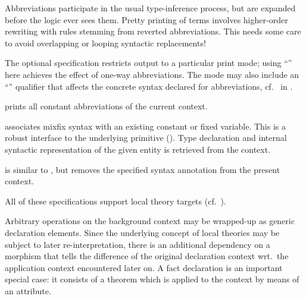 \begin{isabellebody}
\begin{isamarkuptext}
\begin{descr}
  Abbreviations participate in the usual type-inference process, but
  are expanded before the logic ever sees them.  Pretty printing of
  terms involves higher-order rewriting with rules stemming from
  reverted abbreviations.  This needs some care to avoid overlapping
  or looping syntactic replacements!
  
  The optional  specification restricts output to a
  particular print mode; using ``'' here achieves the
  effect of one-way abbreviations.  The mode may also include an
  ``\mbox{}'' qualifier that affects the concrete syntax
  declared for abbreviations, cf.\ \mbox{} in
  .
  
  \item [\mbox{\isa{\isacommand{print{\isacharunderscore}abbrevs}}}] prints all constant abbreviations
  of the current context.
  
  \item [\mbox{\isa{\isacommand{notation}}}~\isa{{\isachardoublequote}c\ {\isacharparenleft}mx{\isacharparenright}{\isachardoublequote}}] associates mixfix
  syntax with an existing constant or fixed variable.  This is a
  robust interface to the underlying \mbox{} primitive
  ().  Type declaration and internal syntactic
  representation of the given entity is retrieved from the context.
  
  \item [\mbox{\isa{\isacommand{no{\isacharunderscore}notation}}}] is similar to \mbox{}, but removes the specified syntax annotation from the
  present context.

  \end{descr}

  All of these specifications support local theory targets (cf.\
  ).%
\end{isamarkuptext}%
\isamarkuptrue%
%
\isamarkuptrue%
%
\begin{isamarkuptext}%
Arbitrary operations on the background context may be wrapped-up as
  generic declaration elements.  Since the underlying concept of local
  theories may be subject to later re-interpretation, there is an
  additional dependency on a morphism that tells the difference of the
  original declaration context wrt.\ the application context
  encountered later on.  A fact declaration is an important special
  case: it consists of a theorem which is applied to the context by
  means of an attribute.


\end{isamarkuptext}
\end{isabellebody}
